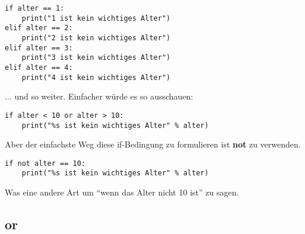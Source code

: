 \begin{Verbatim}[frame=single]
if alter == 1:
    print("1 ist kein wichtiges Alter")
elif alter == 2:
    print("2 ist kein wichtiges Alter")
elif alter == 3:
    print("3 ist kein wichtiges Alter")
elif alter == 4:
    print("4 ist kein wichtiges Alter")
\end{Verbatim}

\noindent
\texorpdfstring{$\ldots$}{...} und so weiter. Einfacher würde es so ausschauen:
\begin{Verbatim}[frame=single]
if alter < 10 or alter > 10:
    print("%s ist kein wichtiges Alter" % alter)
\end{Verbatim}

\noindent
Aber der einfachste Weg diese if-Bedingung zu formulieren ist \textbf{not} zu verwenden.

\begin{Verbatim}[frame=single]
if not alter == 10:
    print("%s ist kein wichtiges Alter" % alter)
\end{Verbatim}

\noindent
Was eine andere Art um ``wenn das Alter nicht 10 ist'' zu sagen.

\subsection*{or}

